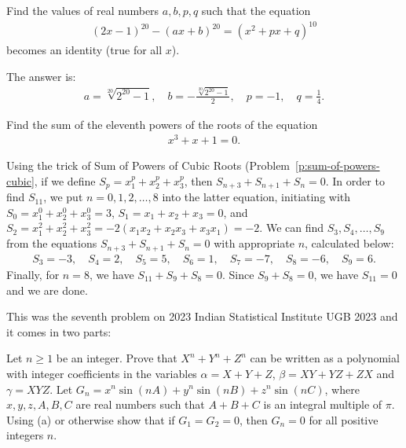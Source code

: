\begin{question}
    Find the values of real numbers $a,b,p,q$ such that the equation
    \begin{align*}
        (2x-1)^{20} - (ax+b)^{20} = (x^2+px+q)^{10}
    \end{align*}
    becomes an identity  (true for all $x$).
\end{question}

\begin{solution}
    The answer is:
    \begin{align*}
        a= \sqrt[20]{2^{20}-1}, \quad b=-\frac{\sqrt[20]{2^{20}-1}}{2}, \quad p=-1, \quad q=\frac{1}{4}.
    \end{align*}
\end{solution}

\begin{question}
    Find the sum of the eleventh powers of the roots of the equation 
    \begin{align*}
        x^3+x+1=0.
    \end{align*}
\end{question}

\begin{solution}[name=Solution by Parviz Shahriari]
    Using the trick of Sum of Powers of Cubic Roots (Problem~\ref{p:sum-of-powers-cubic}, if we define $S_p=x_1^p+x_2^p+x_3^p$, then $S_{n+3}+S_{n+1}+S_{n}=0$. In order to find $S_{11}$, we put $n=0,1,2,\dots,8$ into the latter equation, initiating with $S_0=x_1^0+x_2^0+x_3^0=3$, $S_1=x_1+x_2+x_3=0$, and $S_2 = x_1^2+x_2^2+x_3^2=-2(x_1x_2+x_2x_3+x_3x_1)=-2$. We can find $S_3,S_4,\dots,S_9$ from the equations $S_{n+3}+S_{n+1}+S_{n}=0$ with appropriate $n$, calculated below:
    \begin{align*}
        S_3 = -3, \quad S_4=2, \quad S_5 = 5, \quad S_6=1, \quad S_7=-7, \quad S_8=-6, \quad S_9=6.
    \end{align*}
    Finally, for $n=8$, we have $S_{11}+S_9+S_8=0$. Since $S_9+S_8=0$, we have $S_{11}=0$ and we are done.
\end{solution}


\begin{question}
This was the seventh problem on 2023 Indian Statistical Institute UGB 2023 and it comes in two parts:
    \begin{tasks}
        \task Let $n \geq 1$ be an integer. Prove that $X^n+Y^n+Z^n$ can be written as a polynomial with integer coefficients in the variables $\alpha=X+Y+Z$, $\beta= XY+YZ+ZX$ and $\gamma = XYZ$.
        \task Let $G_n=x^n \sin(nA)+y^n \sin(nB)+z^n \sin(nC)$, where $x,y,z, A,B,C$ are real numbers such that $A+B+C$ is an integral multiple of $\pi$. Using (a) or otherwise show that if $G_1=G_2=0$, then $G_n=0$ for all positive integers $n$.
    \end{tasks}
\end{question}




